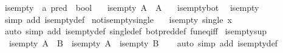 \begin{isabellebody}
\isamarkupfalse%
\ is{\isacharunderscore}{\kern0pt}empty\ {\isacharcolon}{\kern0pt}{\isacharcolon}{\kern0pt}\ {\isachardoublequoteopen}{\isacharprime}{\kern0pt}a\ pred\ {\isasymRightarrow}\ bool{\isachardoublequoteclose}\ \isanewline
\ \ {\isachardoublequoteopen}is{\isacharunderscore}{\kern0pt}empty\ A\ {\isasymlongleftrightarrow}\ A\ {\isacharequal}{\kern0pt}\ {\isasymbottom}{\isachardoublequoteclose}\isanewline
\isanewline
{}\isamarkupfalse%
\ is{\isacharunderscore}{\kern0pt}empty{\isacharunderscore}{\kern0pt}bot{\isacharcolon}{\kern0pt}\isanewline
\ \ {\isachardoublequoteopen}is{\isacharunderscore}{\kern0pt}empty\ {\isasymbottom}{\isachardoublequoteclose}\isanewline
%
\isadelimproof
\ \ %
\endisadelimproof
%
\isatagproof
{}\isamarkupfalse%
\ {\isacharparenleft}{\kern0pt}simp\ add{\isacharcolon}{\kern0pt}\ is{\isacharunderscore}{\kern0pt}empty{\isacharunderscore}{\kern0pt}def{\isacharparenright}{\kern0pt}%
\endisatagproof
{\isafoldproof}%
%
\isadelimproof
\isanewline
%
\endisadelimproof
\isanewline
{}\isamarkupfalse%
\ not{\isacharunderscore}{\kern0pt}is{\isacharunderscore}{\kern0pt}empty{\isacharunderscore}{\kern0pt}single{\isacharcolon}{\kern0pt}\isanewline
\ \ {\isachardoublequoteopen}{\isasymnot}\ is{\isacharunderscore}{\kern0pt}empty\ {\isacharparenleft}{\kern0pt}single\ x{\isacharparenright}{\kern0pt}{\isachardoublequoteclose}\isanewline
%
\isadelimproof
\ \ %
\endisadelimproof
%
\isatagproof
{}\isamarkupfalse%
\ {\isacharparenleft}{\kern0pt}auto\ simp\ add{\isacharcolon}{\kern0pt}\ is{\isacharunderscore}{\kern0pt}empty{\isacharunderscore}{\kern0pt}def\ single{\isacharunderscore}{\kern0pt}def\ bot{\isacharunderscore}{\kern0pt}pred{\isacharunderscore}{\kern0pt}def\ fun{\isacharunderscore}{\kern0pt}eq{\isacharunderscore}{\kern0pt}iff{\isacharparenright}{\kern0pt}%
\endisatagproof
{\isafoldproof}%
%
\isadelimproof
\isanewline
%
\endisadelimproof
\isanewline
{}\isamarkupfalse%
\ is{\isacharunderscore}{\kern0pt}empty{\isacharunderscore}{\kern0pt}sup{\isacharcolon}{\kern0pt}\isanewline
\ \ {\isachardoublequoteopen}is{\isacharunderscore}{\kern0pt}empty\ {\isacharparenleft}{\kern0pt}A\ {\isasymsqunion}\ B{\isacharparenright}{\kern0pt}\ {\isasymlongleftrightarrow}\ is{\isacharunderscore}{\kern0pt}empty\ A\ {\isasymand}\ is{\isacharunderscore}{\kern0pt}empty\ B{\isachardoublequoteclose}\isanewline
%
\isadelimproof
\ \ %
\endisadelimproof
%
\isatagproof
{}\isamarkupfalse%
\ {\isacharparenleft}{\kern0pt}auto\ simp\ add{\isacharcolon}{\kern0pt}\ is{\isacharunderscore}{\kern0pt}empty{\isacharunderscore}{\kern0pt}def{\isacharparenright}{\kern0pt}%

\end{isabellebody}
